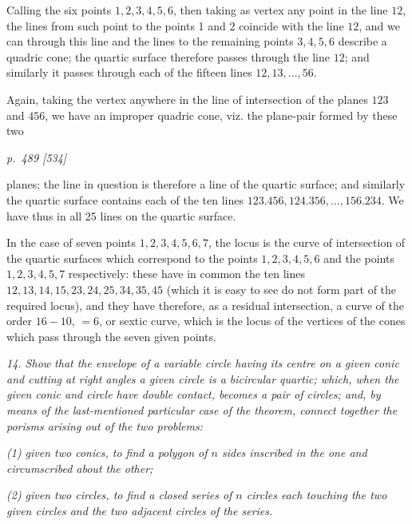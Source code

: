 \documentclass[11pt,a4paper]{article}
\theoremstyle{plain}
\theoremstyle{definition}
\newcommand{\sect}[1]{\medskip\noindent\textit{#1}}
\begin{document}
Calling the six points $1,2,3,4,5,6$, then taking as vertex any point in the line
$12$, the lines from such point to the points 1 and 2 coincide with the line $12$,
and we can through this line and the lines to the remaining points $3,4,5,6$
describe a quadric cone; the quartic surface therefore passes through the line $12$;
and similarly it passes through each of the fifteen lines $12,13,\ldots,56$.

Again, taking the vertex anywhere in the line of intersection of the planes $123$
and $456$, we have an improper quadric cone, viz. the plane-pair formed by these
two
\clearpage

\bigskip
\textit{p.~489 [534]}
\smallskip

\noindent
planes; the line in question is therefore a line of the quartic surface; and similarly
the quartic surface contains each of the ten lines
$123.456,124.356,\ldots,156.234$. We have thus in all 25 lines on the quartic
surface.

In the case of seven points $1,2,3,4,5,6,7$, the locus is the curve of intersection
of the quartic surfaces which correspond to the points $1,2,3,4,5,6$ and the points
$1,2,3,4,5,7$ respectively: these have in common the ten lines
$12,13,14,15,23,24,25,34,35,45$ (which it is easy to see do not form part of the
required locus), and they have therefore, as a residual intersection, a curve of the
order $16-10$, $=6$, or sextic curve, which is the locus of the vertices of the cones
which pass through the seven given points.

\sect{14. Show that the envelope of a variable circle having its centre on a given
conic and cutting at right angles a given circle is a bicircular quartic; which, when
the given conic and circle have double contact, becomes a pair of circles; and, by
means of the last-mentioned particular case of the theorem, connect together the
porisms arising out of the two problems:}

\sect{(1) given two conics, to find a polygon of $n$ sides inscribed in the one and
circumscribed about the other;}

\sect{(2) given two circles, to find a closed series of $n$ circles each touching the two
given circles and the two adjacent circles of the series.}
\end{document}
